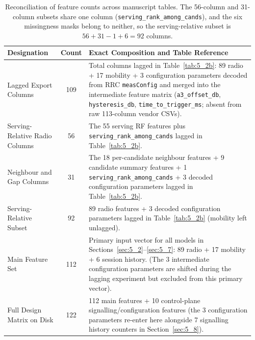 \begin{table}[htbp]
\centering
\caption{Reconciliation of feature counts across manuscript tables. The 56-column and 31-column subsets share one column (\texttt{serving\_rank\_among\_cands}), and the six missingness masks belong to neither, so the serving-relative subset is $56 + 31 - 1 + 6 = 92$ columns.}
\label{tab:B_reconcile}
\vspace{0.4em}
\singlespacing
\small
\begin{tabularx}{\linewidth}{l c X}
\toprule
\textbf{Designation} & \textbf{Count} & \textbf{Exact Composition and Table Reference} \\
\midrule
Lagged Export Columns & 109 & Total columns lagged in Table~\ref{tab:5_2b}: 89 radio + 17 mobility + 3 configuration parameters decoded from RRC \texttt{measConfig} and merged into the intermediate feature matrix (\texttt{a3\_offset\_db}, \texttt{hysteresis\_db}, \texttt{time\_to\_trigger\_ms}; absent from raw 113-column vendor CSVs). \\
Serving-Relative Radio Columns & 56 & The 55 serving RF features plus \texttt{serving\_rank\_among\_cands} lagged in Table~\ref{tab:5_2b}. \\
Neighbour and Gap Columns & 31 & The 18 per-candidate neighbour features + 9 candidate summary features + 1 \texttt{serving\_rank\_among\_cands} + 3 decoded configuration parameters lagged in Table~\ref{tab:5_2b}. \\
Serving-Relative Subset & 92 & 89 radio features + 3 decoded configuration parameters lagged in Table~\ref{tab:5_2b} (mobility left unlagged). \\
Main Feature Set & 112 & Primary input vector for all models in Sections~\ref{sec:5_2}--\ref{sec:5_7}: 89 radio + 17 mobility + 6 session history. (The 3 intermediate configuration parameters are shifted during the lagging experiment but excluded from this primary vector). \\
Full Design Matrix on Disk & 122 & 112 main features + 10 control-plane signalling/configuration features (the 3 configuration parameters re-enter here alongside 7 signalling history counters in Section~\ref{sec:5_8}). \\
\bottomrule
\end{tabularx}
\end{table}

